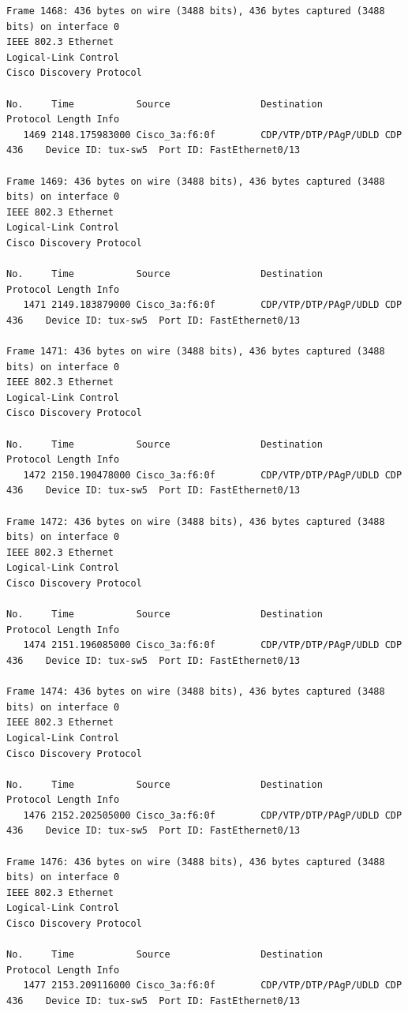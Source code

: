 \documentclass[a4paper,11pt]{article}
\begin{document}
\begin{lstlisting}
Frame 1468: 436 bytes on wire (3488 bits), 436 bytes captured (3488 bits) on interface 0
IEEE 802.3 Ethernet 
Logical-Link Control
Cisco Discovery Protocol

No.     Time           Source                Destination           Protocol Length Info
   1469 2148.175983000 Cisco_3a:f6:0f        CDP/VTP/DTP/PAgP/UDLD CDP      436    Device ID: tux-sw5  Port ID: FastEthernet0/13  

Frame 1469: 436 bytes on wire (3488 bits), 436 bytes captured (3488 bits) on interface 0
IEEE 802.3 Ethernet 
Logical-Link Control
Cisco Discovery Protocol

No.     Time           Source                Destination           Protocol Length Info
   1471 2149.183879000 Cisco_3a:f6:0f        CDP/VTP/DTP/PAgP/UDLD CDP      436    Device ID: tux-sw5  Port ID: FastEthernet0/13  

Frame 1471: 436 bytes on wire (3488 bits), 436 bytes captured (3488 bits) on interface 0
IEEE 802.3 Ethernet 
Logical-Link Control
Cisco Discovery Protocol

No.     Time           Source                Destination           Protocol Length Info
   1472 2150.190478000 Cisco_3a:f6:0f        CDP/VTP/DTP/PAgP/UDLD CDP      436    Device ID: tux-sw5  Port ID: FastEthernet0/13  

Frame 1472: 436 bytes on wire (3488 bits), 436 bytes captured (3488 bits) on interface 0
IEEE 802.3 Ethernet 
Logical-Link Control
Cisco Discovery Protocol

No.     Time           Source                Destination           Protocol Length Info
   1474 2151.196085000 Cisco_3a:f6:0f        CDP/VTP/DTP/PAgP/UDLD CDP      436    Device ID: tux-sw5  Port ID: FastEthernet0/13  

Frame 1474: 436 bytes on wire (3488 bits), 436 bytes captured (3488 bits) on interface 0
IEEE 802.3 Ethernet 
Logical-Link Control
Cisco Discovery Protocol

No.     Time           Source                Destination           Protocol Length Info
   1476 2152.202505000 Cisco_3a:f6:0f        CDP/VTP/DTP/PAgP/UDLD CDP      436    Device ID: tux-sw5  Port ID: FastEthernet0/13  

Frame 1476: 436 bytes on wire (3488 bits), 436 bytes captured (3488 bits) on interface 0
IEEE 802.3 Ethernet 
Logical-Link Control
Cisco Discovery Protocol

No.     Time           Source                Destination           Protocol Length Info
   1477 2153.209116000 Cisco_3a:f6:0f        CDP/VTP/DTP/PAgP/UDLD CDP      436    Device ID: tux-sw5  Port ID: FastEthernet0/13  


\end{lstlisting}
\end{document}
